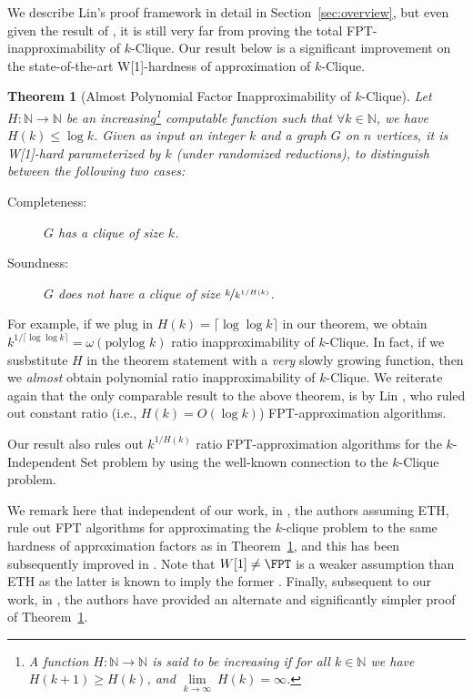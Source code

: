 \documentclass[10pt,a4paper]{article}
\renewcommand{\ge}{ \geqslant}
\renewcommand{\le}{ \leqslant}
\newtheorem{theorem}{Theorem}[section]
\begin{document}
We describe Lin's proof framework in detail in Section~\ref{sec:overview}, but even given the result of \cite{L21}, it is still very far from proving the total FPT-inapproximability of $k$-Clique. Our result below is a significant improvement on the state-of-the-art W[1]-hardness of approximation of $k$-Clique. 

 


\begin{theorem}[Almost Polynomial Factor Inapproximability of $k$-Clique]\label{thm:main}
Let $H:\mathbb{N}\to\mathbb{N}$ be an increasing\footnote{\label{footnote:increasing}A function $H:\mathbb{N}\to\mathbb{N}$ is said to be increasing if for all $k\in\mathbb{N}$ we have $H(k+1)\ge H(k)$, and $\underset{k\to\infty}{\lim}\ H(k)=\infty$.} computable function such that $\forall k\in\mathbb{N}$, we have $H(k)\le \log k$. Given as input an integer $k$ and a graph $G$ on $n$ vertices, it is W[1]-hard parameterized by $k$ (under randomized reductions), to distinguish between the following two cases:
 \begin{description}
 \item[Completeness:]$G$ has a clique of size $k$.
 \item[Soundness:] $G$ does not have a clique of size $\nicefrac{k}{k^{1/H(k)}}$.
 \end{description}
\end{theorem}


For example, if we plug in $H(k)=\lceil \log\log k\rceil $  in our theorem, we obtain $k^{1/\lceil \log\log k\rceil}=\omega(\text{polylog } k)$ ratio inapproximability of $k$-Clique. In fact, if we susbstitute $H$ in the theorem statement with a \emph{very} slowly growing function, then we \emph{almost} obtain polynomial ratio inapproximability of $k$-Clique. We reiterate again that the only comparable result to the above theorem, is by Lin  \cite{L21}, who ruled out constant ratio (i.e., $H(k)=O(\log k)$) FPT-approximation algorithms.  

Our result also rules out $k^{1/H(k)}$ ratio FPT-approximation algorithms for the $k$-Independent Set problem by using the well-known connection to the $k$-Clique problem. 

We remark here that independent of our work, in \cite{LRSW21}, the authors assuming ETH, rule out FPT algorithms for approximating the $k$-clique problem to the  same hardness of approximation factors as in Theorem~\ref{thm:main}, and this has been subsequently improved in \cite{LinRSW23,GuruswamiLRS024}. Note that $W[1]\neq \FPT$ is a weaker assumption than ETH as the latter is known to imply the former \cite{CHKX06a,CHKX06b}. 
Finally, subsequent to our work, in \cite{CFLL25}, the authors have provided an alternate and significantly simpler proof of Theorem~\ref{thm:main}.
\end{document}
